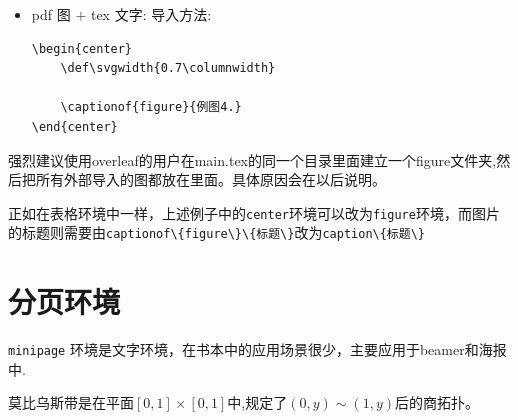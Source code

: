 \begin{itemize}
\begin{verbatim}
\begin{center}
    
    \captionof{figure}{例图3}
\end{center}        
    \end{verbatim}
    \begin{center}
    
    \end{center}   
    \item pdf 图 $+$ tex 文字: 导入方法:
    \begin{verbatim}
\begin{center}
    \def\svgwidth{0.7\columnwidth}
    
    \captionof{figure}{例图4.}
\end{center}
    \end{verbatim}
    \begin{center}
    \def\svgwidth{0.7\columnwidth}
    
    \label{fig:Ragdoll}
\end{center}
\end{itemize}
\begin{remark}
    强烈建议使用overleaf的用户在main.tex的同一个目录里面建立一个figure文件夹,然后把所有外部导入的图都放在里面。具体原因会在以后说明。
\end{remark}
\begin{remark}
    正如在表格环境中一样，上述例子中的\textcolor{red!50!black}{\Verb"center"}环境可以改为\textcolor{red!50!black}{\Verb"figure"}环境，而图片的标题则需要由\textcolor{red!50!black}{\Verb"captionof\{figure\}\{标题\}"}改为\textcolor{red!50!black}{\Verb"caption\{标题\}"}
\end{remark}







\section{分页环境}
\textcolor{red!50!black}{\Verb"minipage"} 环境是文字环境，在书本中的应用场景很少，主要应用于beamer和海报中.
\begin{proposition}
\begin{minipage}{0.5\textwidth}
莫比乌斯带是在平面$[0,1]\times[0,1]$中,规定了$(0,y) \sim (1,y)$后的商拓扑。
\end{minipage}
\begin{minipage}{0.5\textwidth}
    \begin{center}
    
    \end{center} 
\end{minipage}
\end{proposition}




